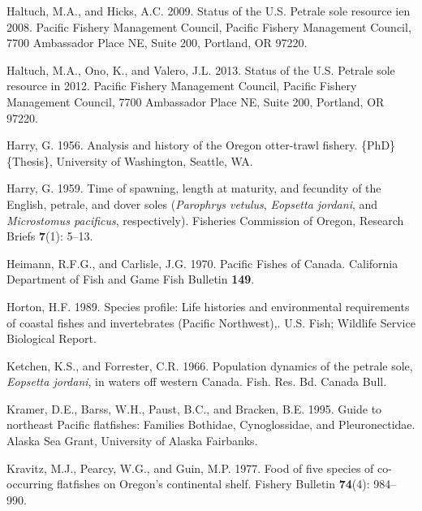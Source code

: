 \documentclass[11pt,
  english,
  letterpaper,
]{article}
\newlength{\cslhangindent}
\newenvironment{CSLReferences}[2] %
 {%
  \setlength{\parindent}{0pt}
  \ifodd #1 \everypar{\setlength{\hangindent}{\cslhangindent}}\ignorespaces\fi
  \ifnum #2 > 0
  \setlength{\parskip}{#2\baselineskip}
  \fi
 }%
 {}
\begin{document}
\begin{CSLReferences}{1}{0}
\leavevmode{}%
Haltuch, M.A., and Hicks, A.C. 2009. Status of the {U}.{S}. Petrale sole resource ien 2008. Pacific Fishery Management Council, Pacific Fishery Management Council, 7700 Ambassador Place NE, Suite 200, Portland, OR 97220.

\leavevmode{}%
Haltuch, M.A., Ono, K., and Valero, J.L. 2013. Status of the {U}.{S}. Petrale sole resource in 2012. Pacific Fishery Management Council, Pacific Fishery Management Council, 7700 Ambassador Place NE, Suite 200, Portland, OR 97220.

\leavevmode{}%
Harry, G. 1956. Analysis and history of the {Oregon} otter-trawl fishery. \{PhD\} \{Thesis\}, University of Washington, Seattle, WA.

\leavevmode{}%
Harry, G. 1959. Time of spawning, length at maturity, and fecundity of the {English}, petrale, and dover soles (\emph{{Parophrys} vetulus}, \emph{{Eopsetta} jordani}, and \emph{{Microstomus} pacificus}, respectively). Fisheries Commission of Oregon, Research Briefs \textbf{7}(1): 5--13.

\leavevmode{}%
Heimann, R.F.G., and Carlisle, J.G. 1970. Pacific {Fishes} of {Canada}. California Department of Fish and Game Fish Bulletin \textbf{149}.

\leavevmode{}%
Horton, H.F. 1989. Species profile: Life histories and environmental requirements of coastal fishes and invertebrates ({Pacific} {Northwest}),. U.S. Fish; Wildlife Service Biological Report.

\leavevmode{}%
Ketchen, K.S., and Forrester, C.R. 1966. Population dynamics of the petrale sole, \emph{{Eopsetta} jordani}, in waters off western {Canada}. Fish. Res. Bd. Canada Bull.

\leavevmode{}%
Kramer, D.E., Barss, W.H., Paust, B.C., and Bracken, B.E. 1995. Guide to northeast {Pacific} flatfishes: Families {Bothidae}, {Cynoglossidae}, and {Pleuronectidae}. Alaska Sea Grant, University of Alaska Fairbanks.

\leavevmode{}%
Kravitz, M.J., Pearcy, W.G., and Guin, M.P. 1977. Food of five species of co-occurring flatfishes on {Oregon}'s continental shelf. Fishery Bulletin \textbf{74}(4): 984--990.


\end{CSLReferences}
\end{document}
